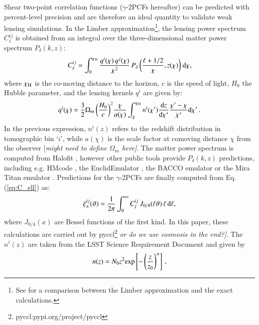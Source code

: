 \documentclass[useAMS,usenatbib]{mn2e}
\begin{document}
 Shear two-point correlation functions ($\gamma$-2PCFs hereafter) can be predicted with percent-level precision and are therefore an ideal quantity to validate weak lensing simulations. In the Limber approximation\footnote{See \citet{Kilbinger17} for a comparison between the Limber approximation and the exact calculations.}, the lensing power spectrum $C^{ij}_{\ell}$ is obtained from an integral over the three-dimensional matter power spectrum $P_{\delta}(k,z)$:
  \begin{eqnarray}
C_{\ell}^{ij} = \int_0^{\chi_{\rm H}}  \frac{q^i(\chi) \,q^j(\chi)}{\chi^2} \, P_{\delta}\, \bigg(\frac{\ell+1/2}{\chi},z(\chi)\bigg) \ {\rm d}\chi,
\label{eq:C_ell}
\end{eqnarray}
where $\chi_{\rm H}$ is the co-moving distance to the horizon, $c$ is the speed of light, $H_0$ the Hubble parameter,  and the  lensing kernels $q^{i}$ are given by:
\begin{eqnarray}
q^i(\chi) = \frac{3}{2}\Omega_{\rm m} \, \bigg(\frac{H_0}{c} \bigg)^2 \frac{\chi}{a(\chi)} \int_{\chi}^{\chi_{\rm H}} n^i(\chi')\frac{{\rm d}z}{{\rm d} \chi'}\frac{\chi' - \chi}{\chi'}{\rm d}\chi' \, .
\label{eq:q_lensing}
\end{eqnarray}
In the previous expression, $n^i(z)$ refers to the redshift distribution  in tomographic bin `$i$', while $a(\chi)$ is the scale factor at comoving distance $\chi$ from the observer {[\it might need to define $\Omega_m$ here]}.  
 The matter power spectrum is computed from  {\sc Halofit} \citep{Takahashi2012}, however  other public tools provide $P_{\delta}(k,z)$ predictions, including e.g. {\sc HMcode} \citep{HMCode2020}, the {\sc EuclidEmulator} \citep{EuclidEmulator}, the {\sc BACCO} emulator \citep{BACCOEmulator} or the Mira Titan emulator \citep{miraTitan}. 
 Predictions for the $\gamma$-2PCFs are finally computed from Eq. (\ref{eq:C_ell}) as:
 \begin{eqnarray}
\xi_{\pm}^{ij}(\vartheta) = \frac{1}{2\pi}\int_0^{\infty} C_{\ell}^{ij} \, J_{0/4}(\ell \vartheta) \, \ell \, {\rm d}\ell,
\label{eq:xipm_th}
\end{eqnarray}
where $J_{0/4}(x)$ are Bessel functions of the first kind. In this paper, these calculations are carried out by {\sc pyccl}\footnote{{\sc pyccl}:pypi.org/project/pyccl}  \citep{CCL} {\it or do we use cosmosis in the end?]}.
The $n^i(z)$ are taken from the LSST Science Requirement Document \citep{LSST-SRD} and given by
 \begin{eqnarray}
n(z) = N_0 z^2 {\rm exp} \left[-\left(\frac{z}{z_0}\right)^\alpha \right]\, ,
\label{eq:nz}
\end{eqnarray}
\end{document}
